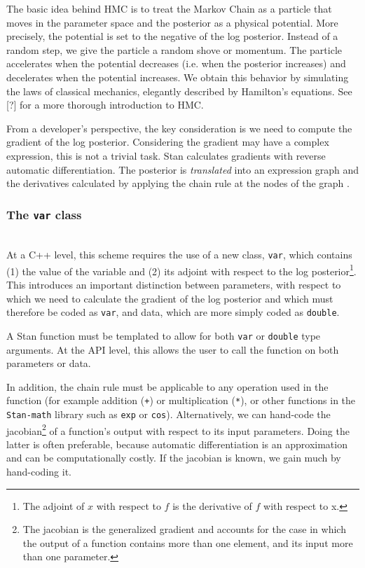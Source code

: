 \documentclass[11pt]{amsart}
\begin{document}
The basic idea behind HMC is to treat the Markov Chain as a particle that moves in the parameter space and the posterior as a physical potential. More precisely, the potential is set to the negative of the log posterior. Instead of a random step, we give the particle a random shove or momentum. The particle accelerates when the potential decreases (i.e. when the posterior increases) and decelerates when the potential increases. We obtain this behavior by simulating the laws of classical mechanics, elegantly described by Hamilton's equations. See [?] for a more thorough introduction to HMC.

From a developer's perspective, the key consideration is we need to compute the gradient of the log posterior. Considering the gradient may have a complex expression, this is not a trivial task. Stan calculates gradients with reverse automatic differentiation. The posterior is \textit{translated} into an expression graph and the derivatives calculated by  applying the chain rule at the nodes of the graph \cite{AD}. 

\subsubsection{The \texttt{var} class} \ \\

At a C++ level, this scheme requires the use of a new class, \texttt{var}, which contains (1) the value of the variable and (2) its adjoint with respect to the log posterior\footnote{The adjoint of $x$ with respect to $f$ is the derivative of $f$ with respect to x.}. This introduces an important distinction between parameters, with respect to which we need to calculate the gradient of the log posterior and which must therefore be coded as \texttt{var}, and data, which are more simply coded as \texttt{double}.

A Stan function must be templated to allow for both \texttt{var} or \texttt{double} type arguments. At the API level, this allows the user to call the function on both parameters or data.

In addition, the chain rule must be applicable to any operation used in the function (for example addition (\texttt{+}) or multiplication (\texttt{*}), or other functions in the \texttt{Stan-math} library such as \texttt{exp} or \texttt{cos}). Alternatively, we can hand-code the jacobian\footnote{The jacobian is the generalized gradient and accounts for the case in which the output of a function contains more than one element, and its input more than one parameter.} of a function's output with respect to its input parameters. Doing the latter is often preferable, because automatic differentiation is an approximation and can be computationally costly. If the jacobian is known, we gain much by hand-coding it. 
\end{document}
